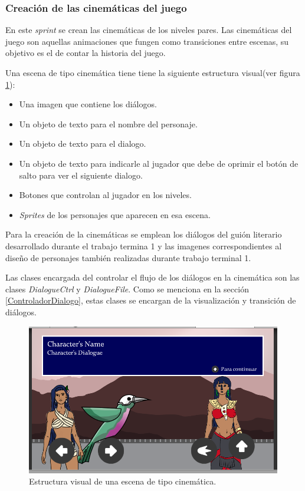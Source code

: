 \subsubsection{Creación de las cinemáticas del juego}
En este \textit{sprint} se crean las cinemáticas de los niveles pares. Las cinemáticas del juego son aquellas animaciones que fungen como transiciones entre escenas, su objetivo es el de contar la historia del juego.
\\
\par
Una escena de tipo cinemática tiene tiene la siguiente estructura visual(ver figura \ref{fig:Cinematica}):
	\begin{itemize}
		\item Una imagen que contiene  los diálogos.
		\item Un objeto de texto para el nombre del personaje.
		\item Un objeto de texto para el dialogo.
		\item Un objeto de texto para indicarle al jugador que debe de oprimir el botón de salto para ver el siguiente dialogo.
		\item Botones que controlan al jugador en los niveles.
		\item \textit{Sprites} de los personajes que aparecen en esa escena. 
	\end{itemize}
Para la creación de la cinemáticas se emplean los diálogos del guión literario desarrollado durante el trabajo termina 1 y las imagenes correspondientes al diseño de personajes también realizadas durante trabajo terminal 1. 
\\
\par
Las clases encargada del controlar el flujo de los diálogos en la cinemática son las clases \textit{DialogueCtrl} y \textit{DialogueFile}. Como se menciona en la sección \ref{ControladorDialogo}, estas clases se encargan de la visualización y transición de diálogos.

\begin{figure}[h]
		\centering
		\includegraphics[height=0.3 \textheight]{03TrabajoRealizado/imagenes/cutscene.png}
		\caption{Estructura visual de una escena de tipo cinemática.}
		\label{fig:Cinematica}
\end{figure}

